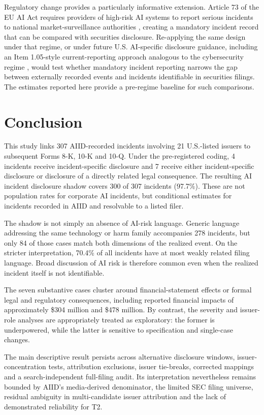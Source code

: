 \documentclass[utf8]{FrontiersinHarvard}
\begin{document}
Regulatory change provides a particularly informative extension. Article 73 of the EU AI Act requires providers of high-risk AI systems to report serious incidents to national market-surveillance authorities \citep{EUAIAct2024}, creating a mandatory incident record that can be compared with securities disclosure. Re-applying the same design under that regime, or under future U.S. AI-specific disclosure guidance, including an Item 1.05-style current-reporting approach analogous to the cybersecurity regime \citep{SEC2023Cyber}, would test whether mandatory incident reporting narrows the gap between externally recorded events and incidents identifiable in securities filings. The estimates reported here provide a pre-regime baseline for such comparisons.

\section{Conclusion}

This study links 307 AIID-recorded incidents involving 21 U.S.-listed issuers to subsequent Forms 8-K, 10-K and 10-Q. Under the pre-registered coding, 4 incidents receive incident-specific disclosure and 7 receive either incident-specific disclosure or disclosure of a directly related legal consequence. The resulting AI incident disclosure shadow covers 300 of 307 incidents (97.7\%). These are not population rates for corporate AI incidents, but conditional estimates for incidents recorded in AIID and resolvable to a listed filer.

The shadow is not simply an absence of AI-risk language. Generic language addressing the same technology or harm family accompanies 278 incidents, but only 84 of those cases match both dimensions of the realized event. On the stricter interpretation, 70.4\% of all incidents have at most weakly related filing language. Broad discussion of AI risk is therefore common even when the realized incident itself is not identifiable.

The seven substantive cases cluster around financial-statement effects or formal legal and regulatory consequences, including reported financial impacts of approximately \$304 million and \$478 million. By contrast, the severity and issuer-role analyses are appropriately treated as exploratory: the former is underpowered, while the latter is sensitive to specification and single-case changes.

The main descriptive result persists across alternative disclosure windows, issuer-concentration tests, attribution exclusions, issuer tie-breaks, corrected mappings and a search-independent full-filing audit. Its interpretation nevertheless remains bounded by AIID's media-derived denominator, the limited SEC filing universe, residual ambiguity in multi-candidate issuer attribution and the lack of demonstrated reliability for T2.
\end{document}
